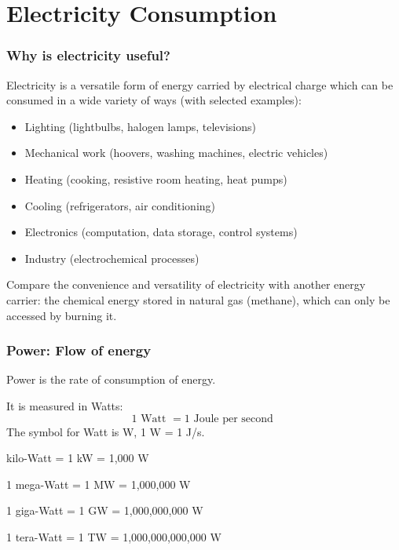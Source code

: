\documentclass[10pt,aspectratio=169,dvipsnames]{beamer}
\let\olditem\item
\renewcommand{\item}{%
\olditem\vspace{5pt}}
\begin{document}
\section{Electricity Consumption}

\begin{frame}
  \frametitle{Why is electricity useful?}

  Electricity is a versatile form of energy carried by electrical
  charge which can be consumed in a wide variety of ways (with selected examples):
  \begin{itemize}
  \item Lighting (lightbulbs, halogen lamps, televisions)
  \item Mechanical work (hoovers, washing machines, electric vehicles)
  \item Heating (cooking, resistive room heating, heat pumps)
  \item Cooling (refrigerators, air conditioning)
  \item Electronics (computation, data storage, control systems)
  \item Industry (electrochemical processes)
  \end{itemize}

  Compare the convenience and versatility of electricity with another
  energy carrier: the chemical energy stored in natural gas (methane),
  which can only be accessed by burning it.

\end{frame}



\begin{frame}
  \frametitle{Power: Flow of energy}

  \alert{Power} is the rate of consumption of energy.

  It is measured in \alert{Watts}:
  \begin{equation*}
     1 \textrm{ Watt } = 1 \textrm{ Joule per second }
  \end{equation*}
  The symbol for Watt is W, 1 W = 1 J/s.

   kilo-Watt = 1 kW = 1,000 W

  1 mega-Watt = 1 MW = 1,000,000 W

  1 giga-Watt = 1 GW = 1,000,000,000 W

  1 tera-Watt = 1 TW = 1,000,000,000,000 W


\end{frame}
\end{document}
